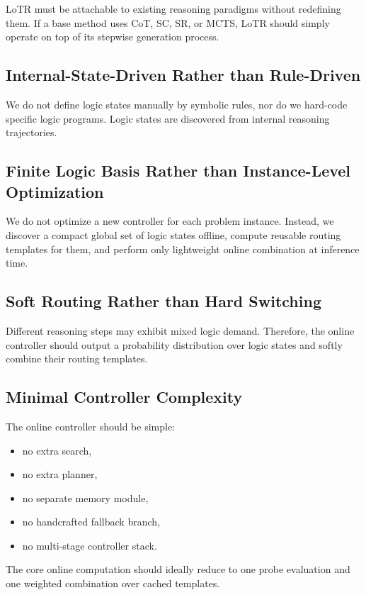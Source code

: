 \documentclass[11pt]{article}
\begin{document}
LoTR must be attachable to existing reasoning paradigms without redefining them. If a base method uses CoT, SC, SR, or MCTS, LoTR should simply operate on top of its stepwise generation process.

\subsection{Internal-State-Driven Rather than Rule-Driven}

We do not define logic states manually by symbolic rules, nor do we hard-code specific logic programs. Logic states are discovered from internal reasoning trajectories.

\subsection{Finite Logic Basis Rather than Instance-Level Optimization}

We do not optimize a new controller for each problem instance. Instead, we discover a compact global set of logic states offline, compute reusable routing templates for them, and perform only lightweight online combination at inference time.

\subsection{Soft Routing Rather than Hard Switching}

Different reasoning steps may exhibit mixed logic demand. Therefore, the online controller should output a probability distribution over logic states and softly combine their routing templates.

\subsection{Minimal Controller Complexity}

The online controller should be simple:
\begin{itemize}[leftmargin=1.5em]
    \item no extra search,
    \item no extra planner,
    \item no separate memory module,
    \item no handcrafted fallback branch,
    \item no multi-stage controller stack.
\end{itemize}
The core online computation should ideally reduce to one probe evaluation and one weighted combination over cached templates.
\end{document}
